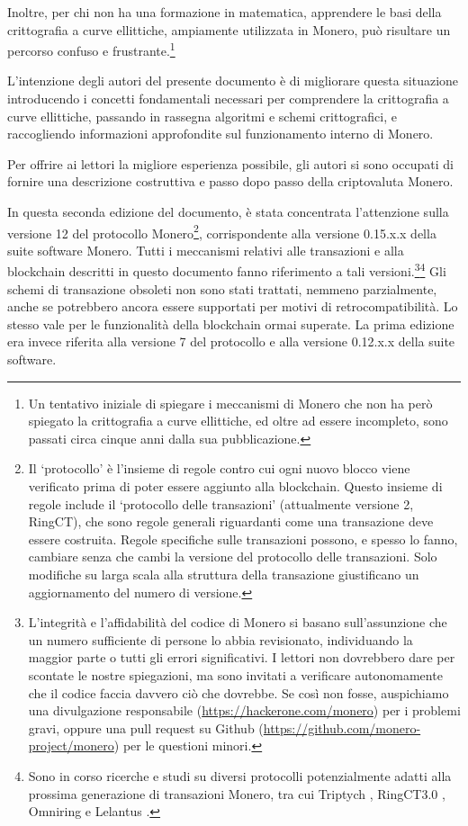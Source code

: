 Inoltre, per chi non ha una formazione in matematica, apprendere le basi della crittografia a curve ellittiche, ampiamente utilizzata in Monero, può risultare un percorso confuso e frustrante.\footnote{Un tentativo iniziale di spiegare i meccanismi di Monero \cite{MRL-0003-about-monero} che non ha però spiegato la crittografia a curve ellittiche, ed oltre ad essere incompleto, sono passati circa cinque anni dalla sua pubblicazione.}

L'intenzione degli autori del presente documento è di migliorare questa situazione introducendo i concetti fondamentali necessari per comprendere la crittografia a curve ellittiche, passando in rassegna algoritmi e schemi crittografici, e raccogliendo informazioni approfondite sul funzionamento interno di Monero.

Per offrire ai lettori la migliore esperienza possibile, gli autori si sono occupati di fornire una descrizione costruttiva e passo dopo passo della criptovaluta Monero.

In questa seconda edizione del documento, è stata concentrata l’attenzione sulla versione 12 del protocollo Monero\footnote{Il `protocollo' è l'insieme di regole contro cui ogni nuovo blocco viene verificato prima di poter essere aggiunto alla blockchain. Questo insieme di regole include il `protocollo delle transazioni' (attualmente versione 2, RingCT), che sono regole generali riguardanti come una transazione deve essere costruita. Regole specifiche sulle transazioni possono, e spesso lo fanno, cambiare senza che cambi la versione del protocollo delle transazioni. Solo modifiche su larga scala alla struttura della transazione giustificano un aggiornamento del numero di versione.}, corrispondente alla versione 0.15.x.x della suite software Monero. Tutti i meccanismi relativi alle transazioni e alla blockchain descritti in questo documento fanno riferimento a tali versioni.\footnote{L'integrità e l'affidabilità del codice di Monero si basano sull'assunzione che un numero sufficiente di persone lo abbia revisionato, individuando la maggior parte o tutti gli errori significativi. I lettori non dovrebbero dare per scontate le nostre spiegazioni, ma sono invitati a verificare autonomamente che il codice faccia davvero ciò che dovrebbe. Se così non fosse, auspichiamo una divulgazione responsabile (\url{https://hackerone.com/monero}) per i problemi gravi, oppure una pull request su Github (\url{https://github.com/monero-project/monero}) per le questioni minori.}\footnote{Sono in corso ricerche e studi su diversi protocolli potenzialmente adatti alla prossima generazione di transazioni Monero, tra cui Triptych \cite{triptych-preprint}, RingCT3.0 \cite{ringct3-preprint}, Omniring \cite{omniring-paper} e Lelantus \cite{lelantus-preprint}.} Gli schemi di transazione obsoleti non sono stati trattati, nemmeno parzialmente, anche se potrebbero ancora essere supportati per motivi di retrocompatibilità. Lo stesso vale per le funzionalità della blockchain ormai superate. La prima edizione \cite{ztm-1} era invece riferita alla versione 7 del protocollo e alla versione 0.12.x.x della suite software.



